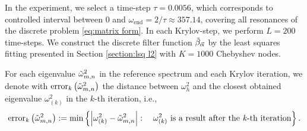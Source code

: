 \documentclass[a4paper,11pt,bibliography=totoc,listof=totoc,headinclude=true,cleardoublepage=empty,oneside]{scrbook}
\newcommand{\dffv}{\Tilde{\beta}_{\Vec{\alpha}}}
\newcommand{\e}{\mathrm{end}}
\begin{document}
In the experiment, we select a time-step $\tau = 0.0056$, which corresponds to controlled interval between $0$ and $\omega_\e = 2/\tau \approx 357.14$, covering all resonances of the discrete problem \ref{eq:matrix form}. In each Krylov-step, we perform $L=200$ time-steps. We construct the discrete filter function $\dffv$ by the least squares fitting presented in Section \ref{section:lsq l2} with $K=1000$ Chebyshev nodes. 

For each eigenvalue $\Tilde{\omega}^2_{m,n}$ in the reference spectrum and each Krylov iteration, we denote with $\mathrm{error}_{k}\left(\Tilde{\omega}^2_{m,n}\right)$ the distance between $\omega^2_h$ and the closest obtained eigenvalue $\omega_{(k)}^2$ in the $k$-th iteration, i.e., 
\begin{equation*}
    \mathrm{error}_{k}\left(\Tilde{\omega}^2_{m,n}\right) := \min\left\{\left|\omega_{(k)}^2 - \Tilde{\omega}^2_{m,n}\right| : \quad \omega_{(k)}^2 \text{ is a result after the \textit{k}-th iteration}\right\}.
\end{equation*}
\end{document}
